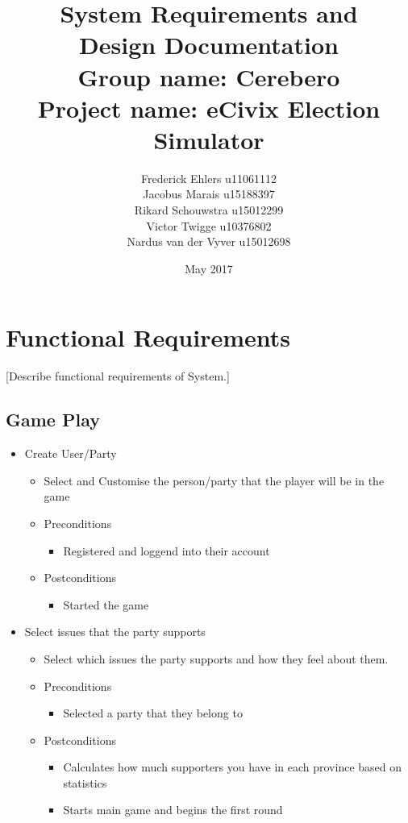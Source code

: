 \documentclass{article}
\title{\textbf{System Requirements and \\Design Documentation}\\
        \textbf{Group name:} Cerebero\\
       \textbf{ Project name:} eCivix Election Simulator}
\date{May 2017}
\author{Frederick Ehlers u11061112 \\
  	  Jacobus Marais u15188397 \\
          Rikard Schouwstra u15012299 \\
          Victor Twigge u10376802 \\
	  Nardus van der Vyver u15012698 \\}
\begin{document}
  \maketitle

  \tableofcontents

  \section{Functional Requirements}
  [Describe functional requirements of System.]
   \subsection{Game Play}
   	\begin{itemize}
   		\item Create User/Party
			\begin{itemize}
				\item Select and Customise the person/party that the player will be in the game
				\item Preconditions
				\begin{itemize}
					\item Registered and loggend into their account
				\end{itemize}
				\item Postconditions
				\begin{itemize}
					\item Started the game
				\end{itemize}
			\end{itemize}
	\end{itemize}
	
	\begin{itemize}
   		\item Select issues that the party supports
			\begin{itemize}
				\item Select which issues the party supports and how they feel about them.
				\item Preconditions
				\begin{itemize}
					\item Selected a party that they belong to
				\end{itemize}
				\item Postconditions
				\begin{itemize}
					\item Calculates how much supporters you have in each province based on statistics
					\item Starts main game and begins the first round
				\end{itemize}
			\end{itemize}
	\end{itemize}
	
\end{document}
